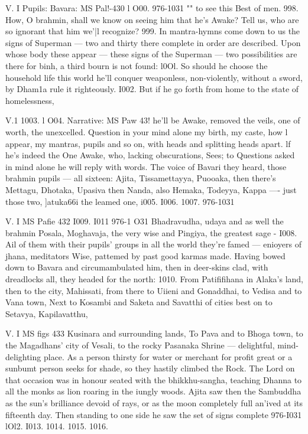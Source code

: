    
   
   V. I
   Pupils:
   Bavara:
   MS Pal!-430
   l O00.
   976-1031 ""
   to see this Best of men. 998.
   How, O brahmin, shall we know
   on seeing him that he's Awake?
   Tell us, who are so ignorant
   that him we'|l recognize? 999.
   In mantra-hymns come down to us
   the signs of Superman —
   two and thirty there complete
   in order are described.
   Upon whose body these appear —
   these signs of the Superman —
   two possibilities are there for binh,
   a third bourn is not found: l0Ol.
   So should he choose the household life
   this world he'll conquer weaponless,
   non-violently, without a sword,
   by Dham1a rule it righteously. I002.
   But if he go forth from home
   to the state of homelessness,
   
   
   
   V.1
   1003.
   l O04.
   Narrative:
   MS Paw 43!
   he'll be Awake, removed the veils,
   one of worth, the unexcelled.
   Question in your mind alone
   my birth, my caste, how l appear,
   my mantras, pupils and so on,
   with heads and splitting heads apart.
   lf he's indeed the One Awake,
   who, lacking obscurations, Sees;
   to Questions asked in mind alone
   he will reply with words.
   The voice of Bavari they heard,
   those brahmin pupils — all sixteen:
   Ajita, Tissamettayya,
   Puooaka, then there's Mettagu,
   Dhotaka, Upasiva then
   Nanda, also Hemaka,
   Todeyya, Kappa —- just those two,
   ]atuka66i the leamed one,
   i005.
   I006.
   1007.
   976-1031
   
   
   
   V. I
   MS Paﬁe 432
   I009.
   I011
   976-1 O31
   Bhadravudha, udaya and
   as well the brahmin Posala,
   Moghavaja, the very wise
   and Pingiya, the greatest sage - I008.
   Ail of them with their pupils' groups
   in all the world they're famed —
   enioyers of jhana, meditators Wise,
   pattemed by past good karmas made.
   Having bowed down to Bavara
   and circumambulated him,
   then in deer-skins clad, with dreadlocks all,
   they headed for the north: 1010.
   From Patiﬁﬁhana in Alaka's land,
   then to the city, Mahissati,
   from there to Uiieni and Gonaddhai,
   to Vedisa and to Vana town,
   Next to Kosambi and Saketa
   and Savatthi of cities best
   on to Setavya, Kapilavatthu,
   
   
   
   V. I
   MS ﬁgs 433
   Kusinara and surrounding lands,
   To Pava and to Bhoga town,
   to the Magadhans' city of Vesali,
   to the rocky Pasanaka Shrine —
   delightful, mind-delighting place.
   As a person thirsty for water
   or merchant for proﬁt great
   or a sunbumt person seeks for shade,
   so they hastily climbed the Rock.
   The Lord on that occasion was
   in honour seated with the bhikkhu-sangha,
   teaching Dhanna to all the monks
   as lion roaring in the iungly woods.
   Ajita saw then the Sambuddha
   as the sun's brilliance devoid of rays,
   or as the moon completely full
   an'ived at its ﬁfteenth day.
   Then standing to one side he saw
   the set of signs complete
   976-I031
   lOl2.
   I013.
   1014.
   1015.
   1016.
   
